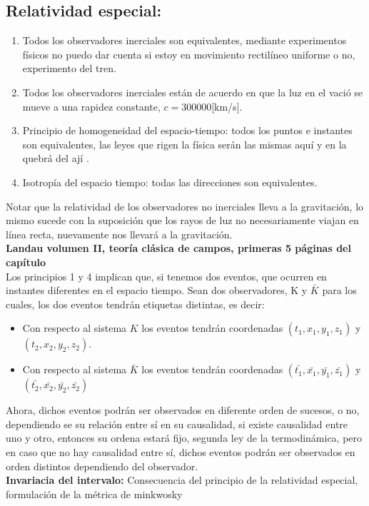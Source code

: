 \documentclass[../main.tex]{subfiles}
\begin{document}
\subsection{Relatividad especial:}
\begin{enumerate}
    \item Todos los observadores inerciales son equivalentes, mediante experimentos físicos no puedo dar cuenta si estoy en movimiento rectilíneo uniforme o no, experimento del tren. 
    \item Todos los observadores inerciales están de acuerdo en que la luz en el vació se mueve a una rapidez constante, $c=300000$[km/s].
    \item Principio de homogeneidad del espacio-tiempo: todos los puntos e instantes son equivalentes, las leyes que rigen la física serán las mismas aquí y en la quebrá del ají .
    \item Isotropía del espacio tiempo: todas las direcciones son equivalentes.
\end{enumerate}
Notar que la relatividad de los observadores no inerciales lleva a la gravitación, lo mismo sucede con la suposición que los rayos de luz no necesariamente viajan en línea recta, nuevamente nos llevará a la gravitación. \\
\textbf{Landau volumen II, teoría clásica de campos, primeras 5 páginas del capítulo} 
\\
Los principios 1 y 4 implican que, si tenemos dos eventos, que ocurren en instantes diferentes en el espacio tiempo. Sean dos observadores, K y $\bar{K}$ para los cuales, los dos eventos tendrán etiquetas distintas, es decir:
\begin{itemize}
    \item Con respecto al sistema $K$ los eventos tendrán coordenadas $(t_1,x_1,y_1,z_1)$ y $(t_2,x_2,y_2,z_2)$.
    \item Con respecto al sistema $\bar{K}$ los eventos tendrán coordenadas $(\bar{t_1},\bar{x_1},\bar{y_1},\bar{z_1})$ y $(\bar{t_2},\bar{x_2},\bar{y_2},\bar{z_2})$
\end{itemize}
Ahora, dichos eventos podrán ser observados en diferente orden de sucesos, o no, dependiendo se su relación entre sí en su causalidad, si existe causalidad entre uno y otro, entonces su ordena estará fijo, segunda ley de la termodinámica, pero en caso que no hay causalidad entre sí, dichos eventos podrán ser observados en orden distintos dependiendo del observador.\\
\textbf{Invariacia del intervalo:} Consecuencia del principio de la relatividad especial, formulación de la métrica de minkwosky
\end{document}
